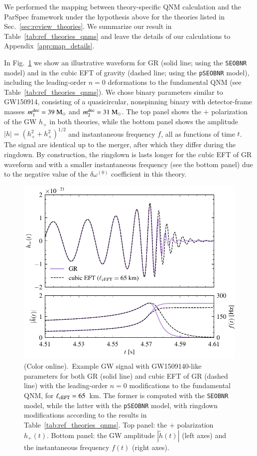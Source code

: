 \documentclass[twocolumn,
               prd,
               aps,
               superscriptaddress,
               tightenlines,
               nofootinbib,
               eqsecnum,
               amsfonts,
               amsmath,
               longbibliography]{revtex4-1}
\newcommand{\pSEOB}{\texttt{pSEOBNR}}
\newcommand{\SEOB}{\texttt{SEOBNR}}
\newcommand{\msun}{~{\rm M}_{\odot}}
\begin{document}
We performed the mapping between theory-specific QNM calculation and the ParSpec framework
under the hypothesis above for the theories listed in Sec.~\ref{sec:review_theories}.
%
We summarize our result in Table~\ref{tab:ref_theories_qnms} and
leave the details of our calculations to Appendix~\ref{app:map_details}.

In Fig.~\ref{fig:example_waveform} we show an illustrative waveform for GR (solid line; using the \texttt{SEOBNR} model) and in the cubic EFT of gravity (dashed line; using the \pSEOB{} model),
including the leading-order $n = 0$ deformations to the fundamental QNM (see Table~\ref{tab:ref_theories_qnms}).
%
We chose binary parameters similar to GW150914, consisting of a quasicircular,
nonspinning binary with detector-frame masses
$m_1^{\rm dec} = 39\msun$ and $m_2^{\rm dec} = 31\msun$.
%
The top panel shows the $+$ polarization of the GW $h_{+}$ in both theories,
while the bottom panel shows the amplitude $|h| = (h_{+}^2 + h_{\times}^2)^{1/2}$
and instantaneous frequency $f$, all as functions of time $t$.
%
The signal are identical up to the merger, after which they differ during the ringdown.
%
By construction, the ringdown is lasts longer for the cubic EFT of GR waveform and
with a smaller instantaneous frequency (see the bottom panel) due to the negative value of the
$\delta\omega^{(0)}$ coefficient in this theory.


\begin{figure}[t]
\includegraphics[width=\columnwidth]{figs/example_waveform_cubicEFT.pdf}
\caption{(Color online).~Example GW signal with GW1509140-like parameters
for both GR (solid line) and cubic EFT of GR (dashed line) with the leading-order
$n=0$ modifications to the fundamental QNM, for $\ell_{\rm cEFT} = 65$~km.
%
The former is computed with the \SEOB{} model, while the latter with the
\pSEOB{} model, with ringdown modifications according to the results in
Table~\ref{tab:ref_theories_qnms}.
%
Top panel: the $+$ polarization $h_{+}(t)$. Bottom panel: the GW amplitude
$|\tilde{h}(t)|$ (left axes) and the instantaneous frequency $f(t)$ (right axes).
}
\label{fig:example_waveform}
\end{figure}
\end{document}
